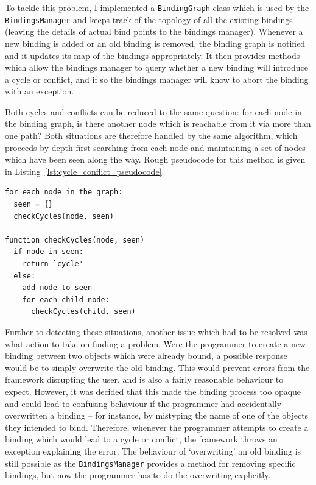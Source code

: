 \documentclass[12pt,twoside,notitlepage]{report}
\begin{document}
To tackle this problem, I implemented a \texttt{BindingGraph} class which is used by the \texttt{BindingsManager} and keeps track of the topology of all the existing bindings (leaving the details of actual bind points to the bindings manager). Whenever a new binding is added or an old binding is removed, the binding graph is notified and it updates its map of the bindings appropriately. It then provides methods which allow the bindings manager to query whether a new binding will introduce a cycle or conflict, and if so the bindings manager will know to abort the binding with an exception.

Both cycles and conflicts can be reduced to the same question: for each node in the binding graph, is there another node which is reachable from it via more than one path? Both situations are therefore handled by the same algorithm, which proceeds by depth-first searching from each node and maintaining a set of nodes which have been seen along the way. Rough pseudocode for this method is given in Listing~\ref{lst:cycle_conflict_pseudocode}.

\begin{lstlisting}[caption={Pseudocode for cycle and conflict detection}, label=lst:cycle_conflict_pseudocode]
for each node in the graph:
  seen = {}
  checkCycles(node, seen)

function checkCycles(node, seen)
  if node in seen:
    return `cycle'
  else:
    add node to seen
    for each child node:
      checkCycles(child, seen)
\end{lstlisting}

Further to detecting these situations, another issue which had to be resolved was what action to take on finding a problem. Were the programmer to create a new binding between two objects which were already bound, a possible response would be to simply overwrite the old binding. This would prevent errors from the framework disrupting the user, and is also a fairly reasonable behaviour to expect. However, it was decided that this made the binding process too opaque and could lead to confusing behaviour if the programmer had accidentally overwritten a binding -- for instance, by mistyping the name of one of the objects they intended to bind. Therefore, whenever the programmer attempts to create a binding which would lead to a cycle or conflict, the framework throws an exception explaining the error. The behaviour of `overwriting' an old binding is still possible as the \texttt{BindingsManager} provides a method for removing specific bindings, but now the programmer has to do the overwriting explicitly.
\end{document}
